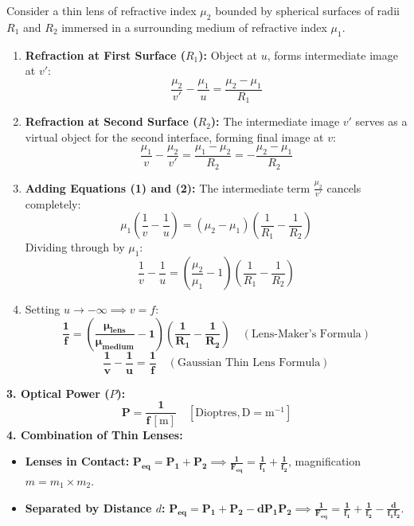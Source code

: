 \documentclass[10pt,a4paper]{article}
\begin{document}
\begin{formulabox}
Consider a thin lens of refractive index $\mu_2$ bounded by spherical surfaces of radii $R_1$ and $R_2$ immersed in a surrounding medium of refractive index $\mu_1$.
\begin{enumerate}
  \item \textbf{Refraction at First Surface ($R_1$):} Object at $u$, forms intermediate image at $v'$:
  \begin{equation}
    \frac{\mu_2}{v'} - \frac{\mu_1}{u} = \frac{\mu_2 - \mu_1}{R_1} \tag{Eq. 1}
  \end{equation}
  \item \textbf{Refraction at Second Surface ($R_2$):} The intermediate image $v'$ serves as a virtual object for the second interface, forming final image at $v$:
  \begin{equation}
    \frac{\mu_1}{v} - \frac{\mu_2}{v'} = \frac{\mu_1 - \mu_2}{R_2} = -\frac{\mu_2 - \mu_1}{R_2} \tag{Eq. 2}
  \end{equation}
  \item \textbf{Adding Equations (1) and (2):} The intermediate term $\frac{\mu_2}{v'}$ cancels completely:
  \begin{equation}
    \mu_1 \left(\frac{1}{v} - \frac{1}{u}\right) = (\mu_2 - \mu_1)\left(\frac{1}{R_1} - \frac{1}{R_2}\right)
  \end{equation}
  Dividing through by $\mu_1$:
  \begin{equation}
    \frac{1}{v} - \frac{1}{u} = \left(\frac{\mu_2}{\mu_1} - 1\right)\left(\frac{1}{R_1} - \frac{1}{R_2}\right)
  \end{equation}
  \item Setting $u \to -\infty \implies v = f$:
  \begin{equation}
    \mathbf{\frac{1}{f} = \left(\frac{\mu_{\text{lens}}}{\mu_{\text{medium}}} - 1\right)\left(\frac{1}{R_1} - \frac{1}{R_2}\right)} \quad (\text{Lens-Maker's Formula})
  \end{equation}
  \begin{equation}
    \mathbf{\frac{1}{v} - \frac{1}{u} = \frac{1}{f}} \quad (\text{Gaussian Thin Lens Formula})
  \end{equation}
\end{enumerate}
\textbf{3. Optical Power ($P$):}
\begin{equation}
  \mathbf{P = \frac{1}{f\,[\mathrm{m}]}} \quad [\mathrm{Dioptres}, \mathrm{D} = \mathrm{m}^{-1}]
\end{equation}
\textbf{4. Combination of Thin Lenses:}
\begin{itemize}
  \item \textbf{Lenses in Contact:} $\mathbf{P_{\text{eq}} = P_1 + P_2 \implies \frac{1}{F_{\text{eq}}} = \frac{1}{f_1} + \frac{1}{f_2}}$, magnification $m = m_1 \times m_2$.
  \item \textbf{Separated by Distance $d$:} $\mathbf{P_{\text{eq}} = P_1 + P_2 - d P_1 P_2 \implies \frac{1}{F_{\text{eq}}} = \frac{1}{f_1} + \frac{1}{f_2} - \frac{d}{f_1 f_2}}$.
\end{itemize}
\end{formulabox}
\end{document}

